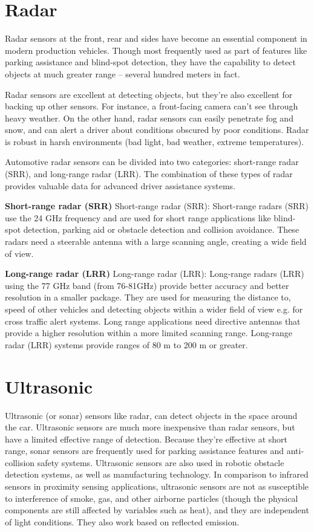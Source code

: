 \section{Radar}

Radar sensors at the front, rear and sides have become an essential component in
modern production vehicles. Though most frequently used as part of features like
parking assistance and blind-spot detection, they have the capability to detect
objects at much greater range – several hundred meters in fact.

Radar sensors are excellent at detecting objects, but they’re also excellent for
backing up other sensors. For instance, a front-facing camera can’t see through
heavy weather. On the other hand, radar sensors can easily penetrate fog and
snow, and can alert a driver about conditions obscured by poor conditions. Radar
is robust in harsh environments (bad light, bad weather, extreme temperatures).

Automotive radar sensors can be divided into two categories: short-range radar
(SRR), and long-range radar (LRR). The combination of these types of radar
provides valuable data for advanced driver assistance systems.

\textbf{Short-range radar (SRR)}
Short-range radar (SRR): Short-range radars (SRR) use the 24 GHz frequency and
are used for short range applications like blind-spot detection, parking aid or
obstacle detection and collision avoidance. These radars need a steerable
antenna with a large scanning angle, creating a wide field of view. 


\textbf{Long-range radar (LRR)}
Long-range radar (LRR): Long-range radars (LRR) using the 77 GHz band (from
76-81GHz) provide better accuracy and better resolution in a smaller package.
They are used for measuring the distance to, speed of other vehicles and
detecting objects within a wider field of view e.g. for cross traffic alert
systems. Long range applications need directive antennas that provide a higher
resolution within a more limited scanning range. Long-range radar (LRR) systems
provide ranges of 80 m to 200 m or greater.

\section{Ultrasonic}

Ultrasonic (or sonar) sensors like radar, can detect objects in the space around
the car. Ultrasonic sensors are much more inexpensive than radar sensors, but
have a limited effective range of detection. Because they’re effective at short
range, sonar sensors are frequently used for parking assistance features and
anti-collision safety systems. Ultrasonic sensors are also used in robotic
obstacle detection systems, as well as manufacturing technology. In comparison
to infrared sensors in proximity sensing applications, ultrasonic sensors are
not as susceptible to interference of smoke, gas, and other airborne particles
(though the physical components are still affected by variables such as heat),
and they are independent of light conditions. They also work based on reflected
emission. 

